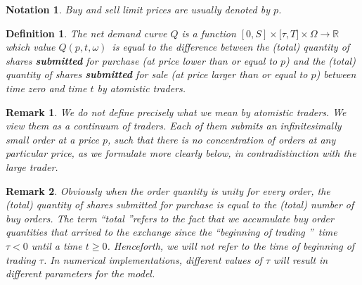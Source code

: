 \documentclass{article}
\newtheorem{definition}{Definition}
\newtheorem{remark}{Remark}
\newtheorem{notation}{Notation}
\begin{document}


\begin{notation}
Buy and sell limit prices are usually denoted by $p$.
\end{notation}



\begin{definition}
The net demand curve $Q$ is a function $[0,S]\times \mathbb{[\tau },T]\times
\Omega \mathbb{\rightarrow R}$ which value $Q(p,t,\omega )$\ is equal to the
difference between the (total) quantity of shares \textbf{submitted} for
purchase (at price lower than or equal to $p$) and the (total) quantity of
shares \textbf{submitted} for sale (at price larger than or equal to $p$)
between time zero and time $t$ by atomistic traders.
\end{definition}



\begin{remark}
We do not define precisely what we mean by atomistic traders. We view them
as a continuum of traders. Each of them submits an infinitesimally small
order at a price $p$, such that there is no concentration of orders at any
particular price, as we formulate more clearly below, in contradistinction
with the large trader.
\end{remark}



\begin{remark}
Obviously when the order quantity is unity for every order, the (total)
quantity of shares submitted for purchase is equal to the (total) number of
buy orders. The term \textquotedblleft total \textquotedblright refers to the fact that we accumulate buy order
quantities that arrived to the exchange since the \textquotedblleft beginning of trading \textquotedblright\
time $\tau <0$ until a time $t\geq 0$. Henceforth, we will not refer to the
time of beginning of trading $\tau $. In numerical implementations,
different values of $\tau $ will result in different parameters for the
model.
\end{remark}


\end{document}
